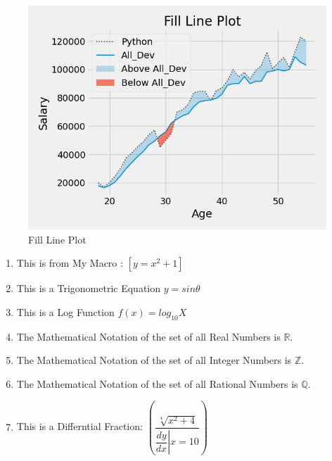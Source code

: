 \documentclass[12pt]{article}
\def\My_Eq{y = x^2+1}
\begin{document}
	\begin{figure}
	\centering
	\includegraphics[scale=0.75]{Fill_Py}
	\caption{Fill Line Plot}
	\end{figure}
	\begin{enumerate}
	\item This is from My Macro : $\left[\My_Eq\right]$ 
	\item This is a Trigonometric Equation $ y = sin\theta $
	\item This is a Log Function $ f(x) = log_{10} X$
	\item The Mathematical Notation of the set of all Real Numbers is $ \mathbb{R} $.
	\item The Mathematical Notation of the set of all Integer Numbers is $ \mathbb{Z} $.
	\item The Mathematical Notation of the set of all Rational Numbers is $ \mathbb{Q} $.
	\item This is a Differntial Fraction: $\left(  \dfrac{\sqrt[4]{x^2+4}}{\left.  \dfrac{dy}{dx} \right|x=10}  \right)$ 
	\end{enumerate}
\end{document}
